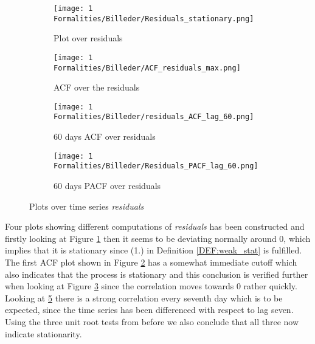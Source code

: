 \begin{figure}[H]
  \centering
  \begin{subfigure}[b]{0.49\textwidth}
    \texttt{[image: 1 Formalities/Billeder/Residuals\_stationary.png]}
    \caption{Plot over residuals}
    \label{fig:Residuals_plotted}
  \end{subfigure}
  \begin{subfigure}[b]{0.49\textwidth}
    \texttt{[image: 1 Formalities/Billeder/ACF\_residuals\_max.png]}
    \caption{ACF over the residuals}
    \label{fig:long_ACF_residuals}
  \end{subfigure}

  \begin{subfigure}[b]{0.49\textwidth}
    \texttt{[image: 1 Formalities/Billeder/residuals\_ACF\_lag\_60.png]}
    \caption{60 days ACF over residuals}
    \label{fig:60_day_ACF_residuals}
  \end{subfigure}
  \begin{subfigure}[b]{0.49\textwidth}
    \texttt{[image: 1 Formalities/Billeder/Residuals\_PACF\_lag\_60.png]}
    \caption{60 days PACF over residuals}
    \label{fig:60_day_PACF_residuals}
  \end{subfigure}
  \caption{Plots over time series \textit{residuals}}
\end{figure}

\noindent Four plots showing different computations of \textit{residuals} has been constructed and firstly looking at Figure \ref{fig:Residuals_plotted} then it seems to be deviating normally around $0$, which implies that it is stationary since (1.) in Definition \ref{DEF:weak_stat} is fulfilled. The first ACF plot shown in Figure \ref{fig:long_ACF_residuals} has a somewhat immediate cutoff which also indicates that the process is stationary and this conclusion is verified further when looking at Figure \ref{fig:60_day_ACF_residuals} since the correlation moves towards 0 rather quickly. Looking at \ref{fig:60_day_PACF_residuals} there is a strong correlation every seventh day which is to be expected, since the time series has been differenced with respect to lag seven. Using the three unit root tests from before we also conclude that all three now indicate stationarity.




